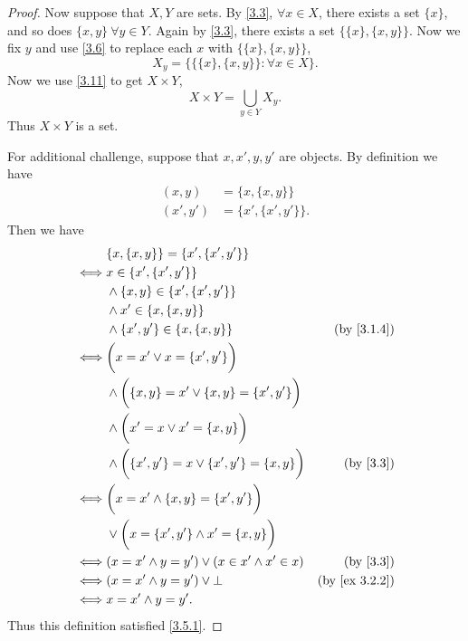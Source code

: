 \begin{proof}
  Now suppose that \(X, Y\) are sets.
  By \cref{3.3}, \(\forall x \in X\), there exists a set \(\{x\}\), and so does \(\{x, y\} \ \forall y \in Y\).
  Again by \cref{3.3}, there exists a set \(\{\{x\}, \{x, y\}\}\).
  Now we fix \(y\) and use \cref{3.6} to replace each \(x\) with \(\{\{x\}, \{x, y\}\}\),
  \[
    X_y = \{\{\{x\}, \{x, y\}\} : \forall x \in X\}.
  \]
  Now we use \cref{3.11} to get \(X \times Y\),
  \[
    X \times Y = \bigcup_{y \in Y} X_y.
  \]
  Thus \(X \times Y\) is a set.

  For additional challenge, suppose that \(x, x', y, y'\) are objects.
  By definition we have
  \begin{align*}
    (x, y)   & = \{x, \{x, y\}\}     \\
    (x', y') & = \{x', \{x', y'\}\}.
  \end{align*}
  Then we have
  \begin{align*}
         & \{x, \{x, y\}\} = \{x', \{x', y'\}\}                                                      \\
    \iff & x \in \{x', \{x', y'\}\}                                                                  \\
         & \land \{x, y\} \in \{x', \{x', y'\}\}                                                     \\
         & \land x' \in \{x, \{x, y\}\}                                                              \\
         & \land \{x', y'\} \in \{x, \{x, y\}\}                        & \text{(by \cref{3.1.4})}    \\
    \iff & \bigg(x = x' \lor x = \{x', y'\}\bigg)                                                    \\
         & \land \bigg(\{x, y\} = x' \lor \{x, y\} = \{x', y'\}\bigg)                                \\
         & \land \bigg(x' = x \lor x' = \{x, y\}\bigg)                                               \\
         & \land \bigg(\{x', y'\} = x \lor \{x', y'\} = \{x, y\}\bigg) & \text{(by \cref{3.3})}      \\
    \iff & \bigg(x = x' \land \{x, y\} = \{x', y'\}\bigg)                                            \\
         & \lor \bigg(x = \{x', y'\} \land x' = \{x, y\}\bigg)                                       \\
    \iff & (x = x' \land y = y') \lor (x \in x' \land x' \in x)        & \text{(by \cref{3.3})}      \\
    \iff & (x = x' \land y = y') \lor \bot                             & \text{(by \cref{ex 3.2.2})} \\
    \iff & x = x' \land y = y'.
  \end{align*}
  Thus this definition satisfied \cref{3.5.1}.
\end{proof}

